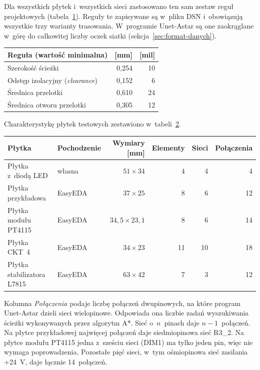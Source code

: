 Dla wszystkich płytek i~wszystkich sieci zastosowano ten sam zestaw reguł
projektowych (tabela~\ref{tab:reguly}). Reguły te zapisywane są w~pliku DSN
i~obowiązują wszystkie trzy warianty trasowania. W~programie Unet-Astar są
one zaokrąglane w~górę do całkowitej liczby oczek siatki
(sekcja~\ref{sec:format-danych}).

\begin{table}[ht]
\label{tab:reguly}
\centering\footnotesize%
\begin{tabular}{l r r}
\toprule
Reguła (wartość minimalna) & [mm] & [mil] \\
\midrule
Szerokość ścieżki & 0{,}254 & 10 \\
\midrule
Odstęp izolacyjny (\emph{clearance}) & 0{,}152 & 6 \\
\midrule
Średnica przelotki & 0{,}610 & 24 \\
\midrule
Średnica otworu przelotki & 0{,}305 & 12 \\
\bottomrule
\end{tabular}
\end{table}

Charakterystykę płytek testowych zestawiono w~tabeli~\ref{tab:plytki-testowe}.

\begin{table}[ht]
\label{tab:plytki-testowe}
\centering\footnotesize%
\begin{tabular}{l l r r r r}
\toprule
Płytka & Pochodzenie & Wymiary [mm] & Elementy & Sieci & Połączenia \\
\midrule
Płytka z~diodą LED & własna & $51 \times 34$ & 4 & 4 & 4 \\
\midrule
Płytka przykładowa & EasyEDA & $37 \times 25$ & 8 & 6 & 12 \\
\midrule
Płytka modułu PT4115 & EasyEDA & $34{,}5 \times 23{,}1$ & 8 & 6 & 14 \\
\midrule
Płytka CKT~4 & EasyEDA & $34 \times 23$ & 11 & 10 & 18 \\
\midrule
Płytka stabilizatora L7815 & EasyEDA & $63 \times 42$ & 7 & 3 & 12 \\
\bottomrule
\end{tabular}
\end{table}

Kolumna \emph{Połączenia} podaje liczbę połączeń dwupinowych, na które
program Unet-Astar dzieli sieci wielopinowe. Odpowiada ona liczbie
zadań wyszukiwania ścieżki wykonywanych przez algorytm A*. Sieć
o~$n$~pinach daje $n-1$~połączeń. Na płytce przykładowej najwięcej
połączeń daje siedmiopinowa sieć R3\_2. Na płytce modułu PT4115 jedna
z~sześciu sieci (DIM1) ma tylko jeden pin, więc nie wymaga poprowadzenia.
Pozostałe pięć sieci, w~tym ośmiopinowa sieć zasilania +24~V, daje łącznie
14~połączeń.


